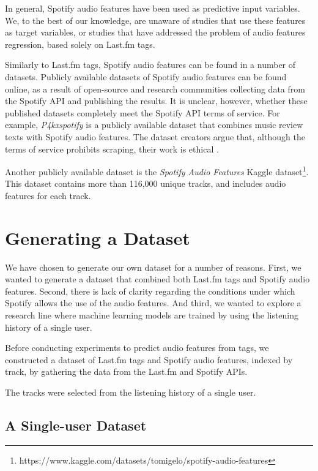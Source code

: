 \documentclass[sn-mathphys]{sn-jnl}%
\theoremstyle{thmstyleone}%
\theoremstyle{thmstyletwo}%
\theoremstyle{thmstylethree}%
\begin{document}
In general, Spotify audio features have been used as predictive input variables.
We, to the best of our knowledge, are unaware of studies that use these features as target variables,
or studies that have addressed the problem of audio features regression, based solely on Last.fm tags.


Similarly to Last.fm tags, Spotify audio features can be found in a number of datasets.
Publicly available datasets of Spotify audio features can be found online,
as a result of open-source and research communities collecting data from the Spotify API and publishing the results.
It is unclear, however, whether these published datasets completely meet the Spotify API terms of service.
For example, \emph{P4kxspotify} is a publicly available dataset that combines music review texts with Spotify audio features.
The dataset creators argue that, although the terms of service prohibits scraping, their work is ethical \cite{pinter2020p4kxspotify}.

Another publicly available dataset is the \emph{Spotify Audio Features} Kaggle dataset\footnote[4]{https://www.kaggle.com/datasets/tomigelo/spotify-audio-features}.
This dataset contains more than 116,000 unique tracks, and includes audio features for each track.



\section{Generating a Dataset}\label{sec4}

We have chosen to generate our own dataset for a number of reasons.
First, we wanted to generate a dataset that combined both Last.fm tags and Spotify audio features.
Second, there is lack of clarity regarding the conditions under which Spotify allows the use of the audio features.
And third, we wanted to explore a research line where machine learning models are trained by using the listening history of a single user.

Before conducting experiments to predict audio features from tags,
we constructed a dataset of Last.fm tags and Spotify audio features, indexed by track, by gathering the data from the Last.fm and Spotify APIs.

The tracks were selected from the listening history of a single user.

\subsection{A Single-user Dataset}
\end{document}
